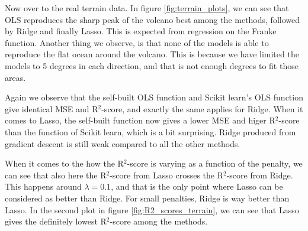 Now over to the real terrain data. In figure \eqref{fig:terrain_plots}, we can see that OLS reproduces the sharp peak of the volcano best among the methods, followed by Ridge and finally Lasso. This is expected from regression on the Franke function. Another thing we observe, is that none of the models is able to reproduce the flat ocean around the volcano. This is because we have limited the models to 5 degrees in each direction, and that is not enough degrees to fit those areas. 

Again we observe that the self-built OLS function and Scikit learn's OLS function give identical MSE and R$^2$-score, and exactly the same applies for Ridge. When it comes to Lasso, the self-built function now gives a lower MSE and higer R$^2$-score than the function of Scikit learn, which is a bit surprising. Ridge produced from gradient descent is still weak compared to all the other methods. 

When it comes to the how the R$^2$-score is varying as a function of the penalty, we can see that also here the R$^2$-score from Lasso crosses the R$^2$-score from Ridge. This happens around $\lambda=0.1$, and that is the only point where Lasso can be considered as better than Ridge. For small penalties, Ridge is way better than Lasso. In the second plot in figure \eqref{fig:R2_scores_terrain}, we can see that Lasso gives the definitely lowest R$^2$-score among the methods.